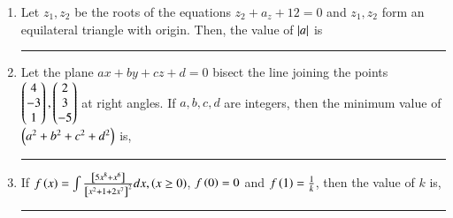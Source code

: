 \documentclass[journal]{IEEEtran}
\begin{document}
\begin{enumerate}
	\item Let $z_1,z_2$ be the roots of the equations $z_2+a_z+12=0$ and $z_1,z_2$ form an equilateral triangle with origin. Then, the value of $\left\vert a\right\vert$ is \rule{2cm}{0.1pt}
	\item Let the plane $ax+by+cz+d=0$ bisect the line joining the points $\begin{pmatrix}4\\-3\\1\end{pmatrix},\begin{pmatrix}2\\3\\-5\end{pmatrix}$ at right angles. If $a,b,c,d$ are integers, then the minimum value of $\left(a^2+b^2+c^2+d^2\right)$ is,\rule{2cm}{0.1pt}
	\item If $f\left(x\right)=\int\frac{{}\left[5x^8+x^6\right]}{{}\left[x^2+1+2x^7\right]^2}dx, \left(x\ge0\right)$, $f\left(0\right)=0$ and $f\left(1\right)=\frac{1}{k}$, then the value of $k$ is, \rule{2cm}{0.1pt}
\end{enumerate}
\end{document}
